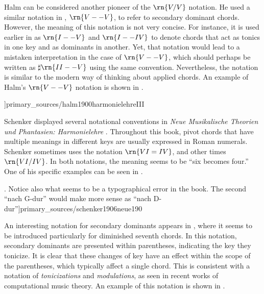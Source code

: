 Halm can be considered another pioneer of the $\rn{V/V}$
notation. He used a similar notation in
\textcite{halm1900harmonielehre}, $\rn{V--V}$, to refer to
secondary dominant chords. However, the meaning of this
notation is not very concise. For instance, it is used
earlier in \textcite[p.~II]{halm1900harmonielehre} as
$\rn{I--V}$ and $\rn{I--IV}$ to denote chords that act as
tonics in one key and as dominants in another. Yet, that
notation would lead to a mistaken interpretation in the case
of $\rn{V--V}$, which should perhaps be written as
$\sharp{}\rn{II--V}$ using the same convention.
Nevertheless, the notation is similar to the modern way of
thinking about applied chords. An example of Halm's
$\rn{V--V}$ notation is shown in
.

\phdfigure[Notation for secondary dominants in
 \textcite[p.~III]{halm1900harmonielehre}]{primary_sources/halm1900harmonielehreIII}

Schenker displayed several notational conventions in
\emph{Neue Musikalische Theorien und Phantasien:
Harmonielehre} \parencite{schenker1906neue}. Throughout this
book, pivot chords that have multiple meanings in different
keys are usually expressed in Roman numerals. Schenker
sometimes uses the notation $\rn{VI=IV}$, and other times
$\rn{VI/IV}$. In both notations, the meaning seems to be
``six becomes four.'' One of his specific examples can be
seen in .



\phdfigure[Notation for applied chords in
\textcite[p.~190]{schenker1906neue}. Notice also what seems
to be a typographical error in the book. The second ``nach
G-dur'' would make more sense as ``nach
D-dur'']{primary_sources/schenker1906neue190}

An interesting notation for secondary dominants appears in
\textcite{white1911harmonic}, where it seems to be
introduced particularly for diminished seventh chords. In
this notation, secondary dominants are presented within
parentheses, indicating the key they tonicize. It is clear
that these changes of key have an effect within the scope of
the parentheses, which typically affect a single chord. This
is consistent with a notation of \emph{tonicizations} and
\emph{modulations}, as seen in recent works of computational
music theory. An example of this notation is shown in
.

